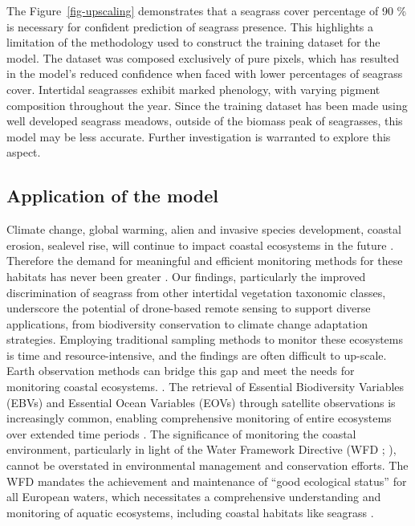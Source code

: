 \documentclass[
  number]{elsarticle}
\begin{document}
The Figure~\ref{fig-upscaling} demonstrates that a seagrass cover
percentage of 90 \% is necessary for confident prediction of seagrass
presence. This highlights a limitation of the methodology used to
construct the training dataset for the model. The dataset was composed
exclusively of pure pixels, which has resulted in the model's reduced
confidence when faced with lower percentages of seagrass cover.
Intertidal seagrasses exhibit marked phenology, with varying pigment
composition throughout the year\citetext{\citealp[
]{bargain2013seasonal}; \citealp{legare2022remote}}. Since the training
dataset has been made using well developed seagrass meadows, outside of
the biomass peak of seagrasses, this model may be less accurate. Further
investigation is warranted to explore this aspect.

\subsection{Application of the model}\label{application-of-the-model}

Climate change, global warming, alien and invasive species development,
coastal erosion, sealevel rise, will continue to impact coastal
ecosystems in the future
\citetext{\citealp{SCHIBALSKI2022101414}; \citealp[
]{holon2018predictive}; \citealp{marquet2024global}}. Therefore the
demand for meaningful and efficient monitoring methods for these
habitats has never been greater \citetext{\citealp[
]{muller2018satellite}; \citealp[
]{villalobos2023remote}; \citealp{oiry2021using}}. Our findings,
particularly the improved discrimination of seagrass from other
intertidal vegetation taxonomic classes, underscore the potential of
drone-based remote sensing to support diverse applications, from
biodiversity conservation to climate change adaptation strategies.
Employing traditional sampling methods to monitor these ecosystems is
time and resource-intensive, and the findings are often difficult to
up-scale. Earth observation methods can bridge this gap and meet the
needs for monitoring coastal ecosystems.
\citep{papathanasopoulou2019satellite}. The retrieval of Essential
Biodiversity Variables (EBVs) and Essential Ocean Variables (EOVs)
through satellite observations is increasingly common, enabling
comprehensive monitoring of entire ecosystems over extended time periods
\citetext{\citealp[
]{ratnarajah2023monitoring}; \citealp{ZOFFOLI2020112020}}. The
significance of monitoring the coastal environment, particularly in
light of the Water Framework Directive (WFD ; \citep{WFD2000}), cannot
be overstated in environmental management and conservation efforts. The
WFD mandates the achievement and maintenance of ``good ecological
status'' for all European waters, which necessitates a comprehensive
understanding and monitoring of aquatic ecosystems, including coastal
habitats like seagrass \citetext{\citealp[
]{foden2007angiosperms}; \citealp[
]{nordlund2024one}; \citealp{Zoffoli2021}}.
\end{document}
